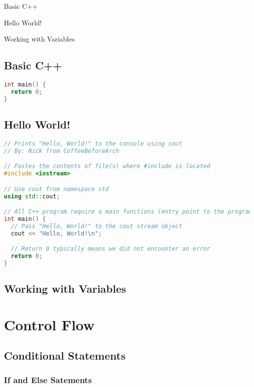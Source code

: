 \documentclass[11pt,fancy,authoryear]{elegantbook}
\begin{document}
\begin{introduction}
  \item Basic C++
  \item Hello World!
  \item Working with Variables
\end{introduction}

\section{Basic C++}

\begin{lstlisting}[language=C++]
int main() {
  return 0;
}
\end{lstlisting}

\section{Hello World!}

\begin{lstlisting}[language=C++]
// Prints "Hello, World!" to the console using cout
// By: Nick from CoffeeBeforeArch

// Pastes the contents of file(s) where #include is located
#include <iostream>

// Use cout from namespace std
using std::cout;

// All C++ program require a main functions (entry point to the program)
int main() {
  // Pass "Hello, World!" to the cout stream object
  cout << "Hello, World!\n";

  // Return 0 typically means we did not encounter an error
  return 0;
}
\end{lstlisting}

\section{Working with Variables}

\chapter{Control Flow}

\section{Conditional Statements}

\subsection{If and Else Satements}
\end{document}
